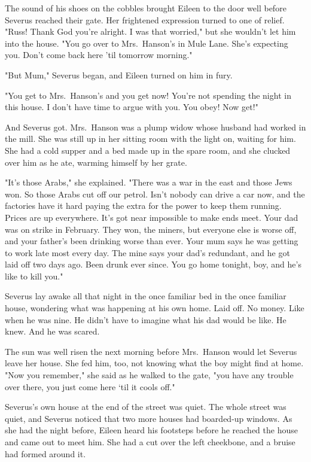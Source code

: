 The sound of his shoes on the cobbles brought Eileen to the door well before Severus reached their gate. Her frightened expression turned to one of relief. "Russ! Thank God you're alright. I was that worried," but she wouldn't let him into the house. "You go over to Mrs.~Hanson's in Mule Lane. She's expecting you. Don't come back here 'til tomorrow morning."

"But Mum," Severus began, and Eileen turned on him in fury.

"You get to Mrs.~Hanson's and you get now! You're not spending the night in this house. I don't have time to argue with you. You obey! Now get!"

And Severus got. Mrs.~Hanson was a plump widow whose husband had worked in the mill. She was still up in her sitting room with the light on, waiting for him. She had a cold supper and a bed made up in the spare room, and she clucked over him as he ate, warming himself by her grate.

"It's those Arabs," she explained. "There was a war in the east and those Jews won. So those Arabs cut off our petrol. Isn't nobody can drive a car now, and the factories have it hard paying the extra for the power to keep them running. Prices are up everywhere. It's got near impossible to make ends meet. Your dad was on strike in February. They won, the miners, but everyone else is worse off, and your father's been drinking worse than ever. Your mum says he was getting to work late most every day. The mine says your dad's redundant, and he got laid off two days ago. Been drunk ever since. You go home tonight, boy, and he's like to kill you."

Severus lay awake all that night in the once familiar bed in the once familiar house, wondering what was happening at his own home. Laid off. No money. Like when he was nine. He didn't have to imagine what his dad would be like. He knew. And he was scared.

The sun was well risen the next morning before Mrs.~Hanson would let Severus leave her house. She fed him, too, not knowing what the boy might find at home. "Now you remember," she said as he walked to the gate, "you have any trouble over there, you just come here `til it cools off."

Severus's own house at the end of the street was quiet. The whole street was quiet, and Severus noticed that two more houses had boarded-up windows. As she had the night before, Eileen heard his footsteps before he reached the house and came out to meet him. She had a cut over the left cheekbone, and a bruise had formed around it.

